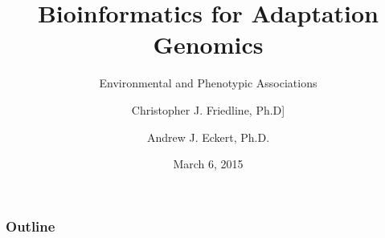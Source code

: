 \documentclass[t]{beamer}
\title{Bioinformatics for Adaptation Genomics}
\subtitle{Environmental and Phenotypic Associations}
\author{Christopher J. Friedline, Ph.D]}
\author{Andrew J. Eckert, Ph.D.}
\institute{Virginia Commonwealth University}
\date{March 6, 2015}
\begin{document}
\begin{frame}
\titlepage
\end{frame}

\begin{frame}
\frametitle{Outline}
\tableofcontents
\end{frame}
\end{document}
